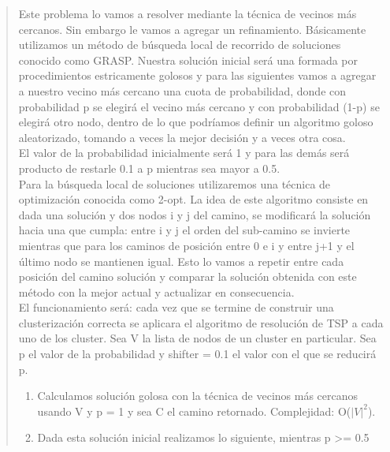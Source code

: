 \documentclass[11pt,a4paper]{article}
\begin{document}
\begin{verse}
Este problema lo vamos a resolver mediante la técnica de vecinos más cercanos. Sin embargo le vamos a agregar un refinamiento. Básicamente utilizamos un método de búsqueda local de recorrido de soluciones conocido como GRASP. Nuestra solución inicial será una formada por procedimientos estricamente golosos y para las siguientes vamos a agregar a nuestro vecino más cercano una cuota de probabilidad, donde con probabilidad p se elegirá el vecino más cercano y con probabilidad (1-p) se elegirá otro nodo, dentro de lo que podríamos definir un algoritmo goloso aleatorizado, tomando a veces la mejor decisión y a veces otra cosa.\\ El valor de la probabilidad inicialmente será 1 y para las demás será producto de restarle 0.1 a p mientras sea mayor a 0.5.\\
Para la búsqueda local de soluciones utilizaremos una técnica de optimización conocida como 2-opt. La idea de este algoritmo consiste en dada una solución y dos nodos i y j del camino, se modificará la solución hacia una que cumpla: entre i y j el orden del sub-camino se invierte mientras que para los caminos de posición entre 0 e i y entre j+1 y el último nodo se mantienen igual. Esto lo vamos a repetir entre cada posición del camino solución y comparar la solución obtenida con este método con la mejor actual y actualizar en consecuencia.
\\
El funcionamiento será: cada vez que se termine de construir una clusterización correcta se aplicara el algoritmo de resolución de TSP a cada uno de los cluster. Sea V la lista de nodos de un cluster en particular. Sea p el valor de la probabilidad y shifter = 0.1 el valor con el que se reducirá p.
\begin{enumerate}
\item Calculamos solución golosa con la técnica de vecinos más cercanos usando V y p = 1 y sea C el camino retornado. Complejidad: O($|V|^{2}$).
\item Dada esta solución inicial realizamos lo siguiente, mientras p >= 0.5
\begin{itemize}


\end{itemize}
\end{enumerate}
\end{verse}
\end{document}
